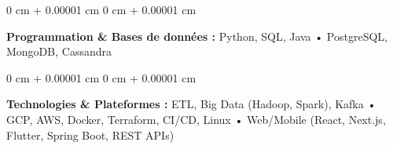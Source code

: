 \documentclass[10pt, letterpaper]{article}
\newenvironment{onecolentry}{
    \begin{adjustwidth}{
        0 cm + 0.00001 cm
    }{
        0 cm + 0.00001 cm
    }
}{
    \end{adjustwidth}
} %
\begin{document}
        
        \begin{onecolentry}
            \textbf{Programmation \& Bases de données :} Python, SQL, Java • PostgreSQL, MongoDB, Cassandra
        \end{onecolentry}

        \vspace{0.2 cm}

        \begin{onecolentry}
            \textbf{Technologies \& Plateformes :} ETL, Big Data (Hadoop, Spark), Kafka • GCP, AWS, Docker, Terraform, CI/CD, Linux • Web/Mobile (React, Next.js, Flutter, Spring Boot, REST APIs)
        \end{onecolentry}


    
\end{document}

